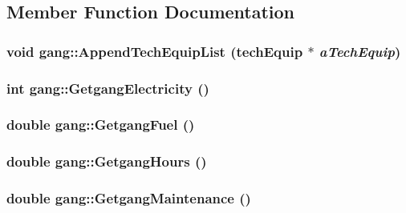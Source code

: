 \subsection{Member Function Documentation}
\hypertarget{classgang_a458435f79e861ed5bbe4315636557000}{
\subsubsection[{AppendTechEquipList}]{\setlength{\rightskip}{0pt plus 5cm}void gang::AppendTechEquipList ({\bf techEquip} $\ast$ {\em aTechEquip})}}
\label{classgang_a458435f79e861ed5bbe4315636557000}
\hypertarget{classgang_aed0d1e381d8520daab677912f58bf85e}{
\subsubsection[{GetgangElectricity}]{\setlength{\rightskip}{0pt plus 5cm}int gang::GetgangElectricity ()}}
\label{classgang_aed0d1e381d8520daab677912f58bf85e}
\hypertarget{classgang_a30f188627195f0f90350619d64d250bf}{
\subsubsection[{GetgangFuel}]{\setlength{\rightskip}{0pt plus 5cm}double gang::GetgangFuel ()}}
\label{classgang_a30f188627195f0f90350619d64d250bf}
\hypertarget{classgang_a153812d5d4b4264d6dfb4d1c79e8c32f}{
\subsubsection[{GetgangHours}]{\setlength{\rightskip}{0pt plus 5cm}double gang::GetgangHours ()}}
\label{classgang_a153812d5d4b4264d6dfb4d1c79e8c32f}
\hypertarget{classgang_a1d704760d4f83677e6214af6a9c79641}{
\subsubsection[{GetgangMaintenance}]{\setlength{\rightskip}{0pt plus 5cm}double gang::GetgangMaintenance ()}}
